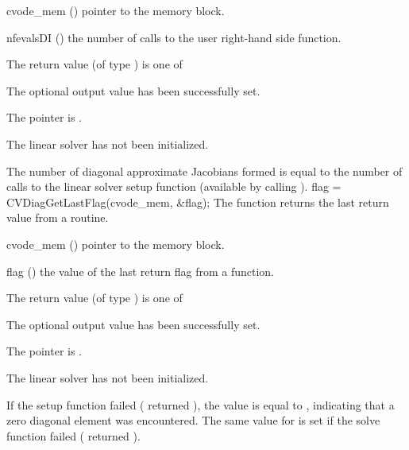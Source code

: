 {
  \begin{args}
  \item[cvode\_mem] ()
    pointer to the {\cvode} memory block.
  \item[nfevalsDI] ()
    the number of calls to the user right-hand side function.
  \end{args}
}
{
  The return value  (of type ) is one of
  \begin{args}
  \item[\Id{CVDIAG\_SUCCESS}] 
    The optional output value has been successfully set.
  \item[\Id{CVDIAG\_MEM\_NULL}]
    The  pointer is .
  \item[\Id{CVDIAG\_LMEM\_NULL}]
    The {\cvdiag} linear solver has not been initialized.
  \end{args}
}
{
  The number of diagonal approximate Jacobians formed is
  equal to the number of calls to the linear solver setup function
  (available by calling ).
}
{
  flag = CVDiagGetLastFlag(cvode\_mem, \&flag);
}
{
  The function  returns the
  last return value from a {\cvdiag} routine. 
}
{
  \begin{args}
  \item[cvode\_mem] ()
    pointer to the {\cvode} memory block.
  \item[flag] ()
    the value of the last return flag from a {\cvdiag} function.
  \end{args}
}
{
  The return value  (of type ) is one of
  \begin{args}
  \item[\Id{CVDIAG\_SUCCESS}] 
    The optional output value has been successfully set.
  \item[\Id{CVDIAG\_MEM\_NULL}]
    The  pointer is .
  \item[\Id{CVDIAG\_LMEM\_NULL}]
    The {\cvdiag} linear solver has not been initialized.
  \end{args}
}
{
  If the {\cvdiag} setup function failed ( returned ),
  the value  is equal to , indicating that a zero
  diagonal element was encountered.
  The same value for  is set if the {\cvdiag} solve function failed
  ( returned ).
}
